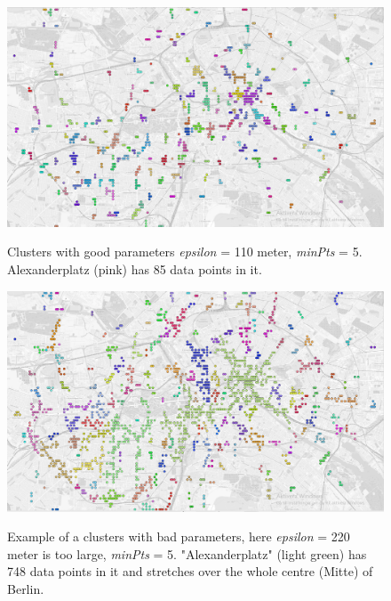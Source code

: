 \begin{figure}[!ht]
	\centering
	\includegraphics[width=1\textwidth]{images/0,001_5_gray.png}\\
	\caption{ Clusters with good parameters \textit{epsilon} = 110 meter, \textit{minPts} = 5. Alexanderplatz (pink) has 85 data points in it.  }
	\label{fig:0.001_5_gray}
\end{figure}

\begin{figure}[!ht]
	\centering
	\includegraphics[width=1\textwidth]{images/0,002_5_gray.png}\\
	\caption{ Example of a clusters with bad parameters, here \textit{epsilon} = 220 meter is too large, \textit{minPts} = 5. "Alexanderplatz" (light green) has 748 data points in it and stretches over the whole centre (Mitte) of Berlin. }
	\label{fig:002_5_gray}
\end{figure}